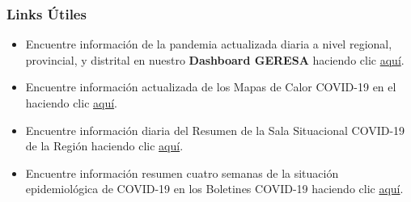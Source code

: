 \documentclass[xcolor=table]{beamer}
\begin{document}

\begin{frame}[label=links]
	\frametitle{Links Útiles}
	\vspace{-.5cm}
	\begin{itemize}
		\item Encuentre {\color{mycolor4} información de la pandemia actualizada diaria a nivel regional, provincial, y distrital} en nuestro {\color{mycolor4}\textbf{Dashboard GERESA}} haciendo clic \href{https://geresacusc.shinyapps.io/GERESA_dashboard/}{\color{mycolor2}aquí}.
		\item Encuentre información actualizada de los {\color{mycolor4}Mapas de Calor COVID-19} en el haciendo clic \href{http://www.diresacusco.gob.pe/diresa/}{\color{mycolor2}aquí}.
		\item Encuentre información diaria del {\color{mycolor4} Resumen de la Sala Situacional COVID-19} de la Región haciendo clic \href{https://app.powerbi.com/view?r=eyJrIjoiZDdiMzA4YWMtZTZmNC00ZWE2LWFmMmYtODkwZmM1ODhiYTljIiwidCI6IjM2NGE0NmEwLTk0YzctNGZkNi1iYTNjLTlmMmQzMjA5YzFlZiJ9}{\color{mycolor2}aquí}.
		\item Encuentre información resumen cuatro semanas de la situación epidemiológica de COVID-19 en los {\color{mycolor4}Boletines COVID-19} haciendo clic \href{https://sites.google.com/view/geresacusco/boletines-epidemiologicos-covid-19}{\color{mycolor2}aquí}. \hyperlink{indice}{}
	\end{itemize}
\end{frame}




\end{document}
